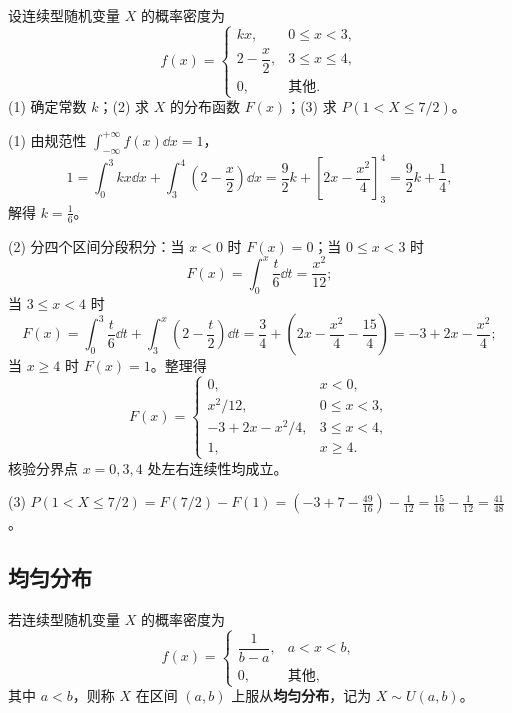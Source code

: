 \begin{example}[title={由密度求归一化常数、分布函数与区间概率}]
\label{eg:piecewise-density}
设连续型随机变量 $X$ 的概率密度为
\[
  f(x)=
  \begin{cases}
    kx,& 0\le x<3,\\
    2-\dfrac{x}{2},& 3\le x\le 4,\\
    0,& \text{其他}.
  \end{cases}
\]
(1) 确定常数 $k$；(2) 求 $X$ 的分布函数 $F(x)$；(3) 求 $P(1<X\le 7/2)$。
\begin{solution}
(1) 由规范性 $\int_{-\infty}^{+\infty}f(x)\dd x=1$，
\[
  1=\int_{0}^{3}kx\dd x+\int_{3}^{4}\left(2-\frac{x}{2}\right)\dd x
  =\frac{9}{2}k+\left[2x-\frac{x^2}{4}\right]_{3}^{4}
  =\frac{9}{2}k+\frac{1}{4},
\]
解得 $k=\frac{1}{6}$。

(2) 分四个区间分段积分：当 $x<0$ 时 $F(x)=0$；当 $0\le x<3$ 时
\[
  F(x)=\int_{0}^{x}\frac{t}{6}\dd t=\frac{x^2}{12};
\]
当 $3\le x<4$ 时
\[
  F(x)=\int_{0}^{3}\frac{t}{6}\dd t+\int_{3}^{x}\left(2-\frac{t}{2}\right)\dd t
  =\frac{3}{4}+\left(2x-\frac{x^2}{4}-\frac{15}{4}\right)
  =-3+2x-\frac{x^2}{4};
\]
当 $x\ge 4$ 时 $F(x)=1$。整理得
\[
  F(x)=
  \begin{cases}
    0,& x<0,\\
    x^2/12,& 0\le x<3,\\
    -3+2x-x^2/4,& 3\le x<4,\\
    1,& x\ge 4.
  \end{cases}
\]
核验分界点 $x=0,3,4$ 处左右连续性均成立。

(3) $P(1<X\le 7/2)=F(7/2)-F(1)=\left(-3+7-\frac{49}{16}\right)-\frac{1}{12}=\frac{15}{16}-\frac{1}{12}=\frac{41}{48}$。
\end{solution}
\end{example}

\subsection{均匀分布}

\begin{definition}[均匀分布]
\label{def:uniform}
若连续型随机变量 $X$ 的概率密度为
\begin{equation}
  f(x)=
  \begin{cases}
    \dfrac{1}{b-a},& a<x<b,\\
    0,& \text{其他},
  \end{cases}
  \label{eq:uniform-density}
\end{equation}
其中 $a<b$，则称 $X$ 在区间 $(a,b)$ 上服从\textbf{均匀分布}，记为 $X\sim U(a,b)$。
\end{definition}

